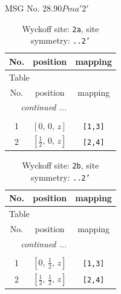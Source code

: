 \documentclass[fleqn,8pt]{jsarticle}
\begin{document}
\setcounter{MaxMatrixCols}{32}

\renewcommand{\tablename}{Table~}
\renewcommand{\figurename}{Figure~}
\begin{center}
\LARGE
MSG No. 28.90\quad$Pma'2'$
\end{center}
\renewcommand{\arraystretch}{1.2}
\begin{longtable}{ccc}
\caption{Wyckoff site: {\tt 2a}, site symmetry: {\tt ..2'}}
 \\
 \hline \hline
No. & position & mapping \\ \hline \endfirsthead

\multicolumn{2}{l}{\tablename\ \thetable{}} \\
 \hline \hline
No. & position & mapping \\ \hline \endhead

 \hline \hline
\multicolumn{2}{r}{\footnotesize\it continued ...} \\ \endfoot

 \hline \hline
\multicolumn{2}{r}{} \\ \endlastfoot

1 & $\left[ 0,\, 0,\, z \right]$ & {\tt [1,3]} \\ \hline
2 & $\left[ \frac{1}{2},\, 0,\, z \right]$ & {\tt [2,4]} \\
\end{longtable}
\renewcommand{\arraystretch}{1.2}
\begin{longtable}{ccc}
\caption{Wyckoff site: {\tt 2b}, site symmetry: {\tt ..2'}}
 \\
 \hline \hline
No. & position & mapping \\ \hline \endfirsthead

\multicolumn{2}{l}{\tablename\ \thetable{}} \\
 \hline \hline
No. & position & mapping \\ \hline \endhead

 \hline \hline
\multicolumn{2}{r}{\footnotesize\it continued ...} \\ \endfoot

 \hline \hline
\multicolumn{2}{r}{} \\ \endlastfoot

1 & $\left[ 0,\, \frac{1}{2},\, z \right]$ & {\tt [1,3]} \\ \hline
2 & $\left[ \frac{1}{2},\, \frac{1}{2},\, z \right]$ & {\tt [2,4]} \\
\end{longtable}
\renewcommand{\arraystretch}{1.2}
\end{document}
